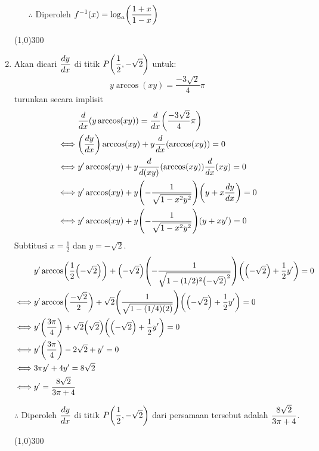 \begin{enumerate}[leftmargin=*, label={\arabic*}.]
\begin{enumerate}[label={\alph*}.]
        $\therefore$ Diperoleh $\ds f^{-1}(x)=\log_{a}\brk*{\frac{1+x}{1-x}}$
    
    \end{enumerate}

\begin{center}\line(1,0){300}\end{center}


\item Akan dicari $\displaystyle \frac{dy}{dx}$ di titik $\ds P\brk*{\frac{1}{2},-\sqrt{2}}$ untuk:
\[
y\arccos(xy) = \frac{-3\sqrt{2}}{4}\pi
\]
turunkan secara implisit
\begin{align*}
    &\drv{x}{y\arccos(xy)} = \drv{x}{\frac{-3\sqrt{2}}{4}\pi}\\
    \iff &\brk*{\frac{dy}{dx}}\arccos(xy)+y\drv{x}{\arccos(xy)} = 0\\
    \iff &y'\arccos(xy)+y\drv{(xy)}{\arccos(xy)}\drv{x}{xy} = 0\\
    \iff &y'\arccos(xy)+y\brk*{-\frac{1}{\sqrt{1-x^{2}y^{2}}}}\brk*{y+x\frac{dy}{dx}} = 0\\
    \iff &y'\arccos(xy)+y\brk*{-\frac{1}{\sqrt{1-x^{2}y^{2}}}}\brk*{y+xy'} = 0\\
\end{align*}
Subtitusi $x=\frac{1}{2}$ dan $y=-\sqrt{2}$.
\begin{align*}
    &y'\arccos\brk*{\frac{1}{2}\brk*{-\sqrt{2}}}+\brk*{-\sqrt{2}}
    \brk*{-\frac{1}{\sqrt{1-(1/2)^{2}\brk*{-\sqrt{2}}^{2}}}}
    \brk*{\brk*{-\sqrt{2}}+\frac{1}{2}y'} = 0\\
    \iff &y'\arccos\brk*{\frac{-\sqrt{2}}{2}}+\sqrt{2}
    \brk*{\frac{1}{\sqrt{1-(1/4)(2)}}}
    \brk*{\brk*{-\sqrt{2}}+\frac{1}{2}y'} = 0\\
    \iff &y'\brk*{\frac{3\pi}{4}}+\sqrt{2}\brk*{\sqrt{2}}
    \brk*{\brk*{-\sqrt{2}}+\frac{1}{2}y'} = 0\\
    \iff &y'\brk*{\frac{3\pi}{4}}-2\sqrt{2}+y'=0\\
    \iff &3\pi y'+4y'=8\sqrt{2}\\
    \iff &y'=\frac{8\sqrt{2}}{3\pi+4}\\
\end{align*}

$\therefore$ Diperoleh $\displaystyle \frac{dy}{dx}$ di titik $\ds P\brk*{\frac{1}{2},-\sqrt{2}}$ dari 
persamaan tersebut adalah $\displaystyle \frac{8\sqrt{2}}{3\pi+4}$.


\begin{center}\line(1,0){300}\end{center}



\end{enumerate}
